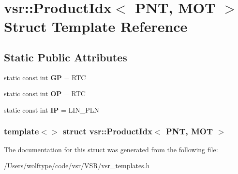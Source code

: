 \hypertarget{structvsr_1_1_product_idx_3_01_p_n_t_00_01_m_o_t_01_4}{\section{vsr\-:\-:Product\-Idx$<$ P\-N\-T, M\-O\-T $>$ Struct Template Reference}
\label{structvsr_1_1_product_idx_3_01_p_n_t_00_01_m_o_t_01_4}
}
\subsection*{Static Public Attributes}
\begin{DoxyCompactItemize}
\item 
\hypertarget{structvsr_1_1_product_idx_3_01_p_n_t_00_01_m_o_t_01_4_a3c8e4cceac63e637ae3763461125d10d}{static const int {\bfseries G\-P} = R\-T\-C}\label{structvsr_1_1_product_idx_3_01_p_n_t_00_01_m_o_t_01_4_a3c8e4cceac63e637ae3763461125d10d}

\item 
\hypertarget{structvsr_1_1_product_idx_3_01_p_n_t_00_01_m_o_t_01_4_a058180d144448d4b2eecd498f46b35b5}{static const int {\bfseries O\-P} = R\-T\-C}\label{structvsr_1_1_product_idx_3_01_p_n_t_00_01_m_o_t_01_4_a058180d144448d4b2eecd498f46b35b5}

\item 
\hypertarget{structvsr_1_1_product_idx_3_01_p_n_t_00_01_m_o_t_01_4_aa4a6106135c7996171847b87d6a33baa}{static const int {\bfseries I\-P} = L\-I\-N\-\_\-\-P\-L\-N}\label{structvsr_1_1_product_idx_3_01_p_n_t_00_01_m_o_t_01_4_aa4a6106135c7996171847b87d6a33baa}

\end{DoxyCompactItemize}
\subsubsection*{template$<$$>$ struct vsr\-::\-Product\-Idx$<$ P\-N\-T, M\-O\-T $>$}



The documentation for this struct was generated from the following file\-:\begin{DoxyCompactItemize}
\item 
/\-Users/wolftype/code/vsr/\-V\-S\-R/vsr\-\_\-templates.\-h\end{DoxyCompactItemize}
